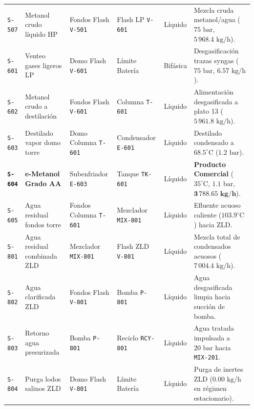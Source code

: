 \documentclass[11pt,letterpaper]{article}
\begin{document}
\begin{xltabular}{\textwidth}{l p{3.1cm} p{2.5cm} p{2.5cm} c X}
\texttt{S-507} & Metanol crudo líquido HP & Fondos Flash \texttt{V-501} & Flash LP \texttt{V-601} & Líquido & Mezcla cruda metanol/agua ($75\text{ bar}$, $5\,968.4\text{ kg/h}$). \\
\texttt{S-601} & Venteo gases ligeros LP & Domo Flash \texttt{V-601} & Límite Batería & Bifásica & Desgasificación trazas syngas ($75\text{ bar}$, $6.57\text{ kg/h}$). \\
\texttt{S-602} & Metanol crudo a destilación & Fondos Flash \texttt{V-601} & Columna \texttt{T-601} & Líquido & Alimentación desgasificada a plato 13 ($5\,961.8\text{ kg/h}$). \\
\texttt{S-603} & Destilado vapor domo torre & Domo Columna \texttt{T-601} & Condensador \texttt{E-601} & Líquido & Destilado condensado a $68.5^\circ\text{C}$ ($1.2\text{ bar}$). \\
\textbf{\texttt{S-604}} & \textbf{e-Metanol Grado AA} & Subenfriador \texttt{E-603} & Tanque \texttt{TK-601} & Líquido & \textbf{Producto Comercial} ($35^\circ\text{C}$, $1.1\text{ bar}$, $\mathbf{3\,788.65\text{ kg/h}}$). \\
\texttt{S-605} & Agua residual fondos torre & Fondos Columna \texttt{T-601} & Mezclador \texttt{MIX-801} & Líquido & Efluente acuoso caliente ($103.9^\circ\text{C}$) hacia ZLD. \\
\texttt{S-801} & Agua residual combinada ZLD & Mezclador \texttt{MIX-801} & Flash ZLD \texttt{V-801} & Líquido & Mezcla total de condensados acuosos ($7\,004.4\text{ kg/h}$). \\
\texttt{S-802} & Agua clarificada ZLD & Fondos Flash \texttt{V-801} & Bomba \texttt{P-801} & Líquido & Agua desgasificada limpia hacia succión de bomba. \\
\texttt{S-803} & Retorno agua presurizada & Bomba \texttt{P-801} & Reciclo \texttt{RCY-801} & Líquido & Agua tratada impulsada a $20\text{ bar}$ hacia \texttt{MIX-201}. \\
\texttt{S-804} & Purga lodos salinos ZLD & Domo Flash \texttt{V-801} & Límite Batería & Líquido & Purga de inertes ZLD ($0.00\text{ kg/h}$ en régimen estacionario). \\
\end{xltabular}
\endgroup
\end{document}
